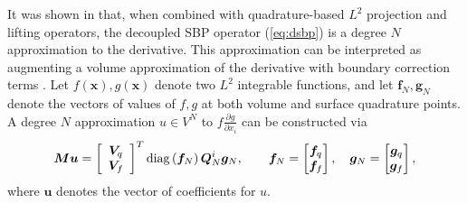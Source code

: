 \documentclass{svjour3}                     %
\newcommand{\diag}[1]{{\rm diag}\LRp{#1}}
\newcommand{\pd}[2]{\frac{\partial#1}{\partial#2}}
\newcommand{\LRp}[1]{\left( #1 \right)}
\newcommand{\LRs}[1]{\left[ #1 \right]}
\renewcommand{\note}[1]{{\color{blue}{#1}}}
\begin{document}
It was shown in \cite{chan2017discretely} that, when combined with quadrature-based $L^2$ projection and lifting operators, the decoupled SBP operator (\ref{eq:dsbp}) is a degree $N$ approximation to the derivative.  This approximation can be interpreted as augmenting a volume approximation of the derivative with boundary correction terms \cite{chan2018efficient}.  Let $f(\bm{x}),g(\bm{x})$ denote two $L^2$ integrable functions, and let $\bm{f}_N, \bm{g}_N$ denote the vectors of values of $f,g$ at both volume and surface quadrature points.  A degree $N$ approximation $u\in V^N$ to $f\pd{g}{x_i}$ can be constructed via
\begin{equation}
\bm{M}\bm{u} = \LRs{\begin{array}{c}
\bm{V}_q \\ \bm{V}_f\end{array}}^T \diag{\bm{f}_N}\bm{Q}^i_N\bm{g}_N, \qquad \bm{f}_N = \begin{bmatrix} \bm{f}_q\\ \bm{f}_f\end{bmatrix}, \quad \bm{g}_N = \begin{bmatrix} \bm{g}_q\\ \bm{g}_f\end{bmatrix}, 
\label{eq:dsbpmatrixform}
\end{equation}
where $\bm{u}$ denotes the vector of coefficients for $u$.  
\end{document}
